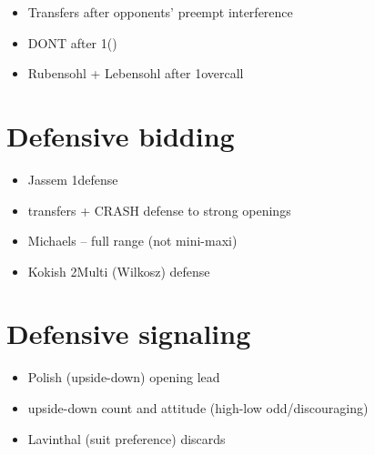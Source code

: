 \documentclass[12pt, a4paper]{report}
\begin{document}
{        \begin{itemize}
            \item Transfers after opponents' preempt interference
            \item DONT after 1\nt (\dbl)
            \item Rubensohl + Lebensohl after 1\nt overcall
        \end{itemize}

    \section*{\colorbox{blue!30}{Defensive bidding}}

        \begin{itemize}
            \item Jassem 1\nt defense
            \item transfers + CRASH defense to strong openings
            \item Michaels -- full range (not mini-maxi)
            \item Kokish 2\diams Multi (Wilkosz) defense
        \end{itemize}

    \section*{\colorbox{blue!30}{Defensive signaling}}

        \begin{itemize}
            \item Polish (upside-down) opening lead
            \item upside-down count and attitude (high-low odd/discouraging)
            \item Lavinthal (suit preference) discards
        \end{itemize}

}
\end{document}
